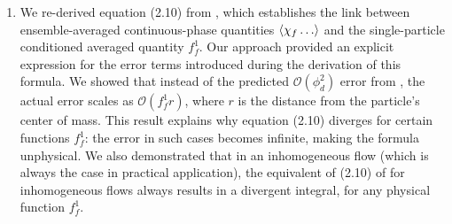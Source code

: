 \begin{enumerate}
    \item We re-derived equation (2.10) from \citet{batchelor1972sedimentation}, which establishes the link between ensemble-averaged continuous-phase quantities $\left<\chi_f\ldots\right>$ and the single-particle conditioned averaged quantity $f_f^1$. 
    Our approach provided an explicit expression for the error terms introduced during the derivation of this formula.
    We showed that instead of the predicted $\mathcal{O}(\phi_d^2)$ error from \citet{batchelor1972sedimentation}, the actual error scales as $\mathcal{O}(f_f^1 r)$, where $r$ is the distance from the particle's center of mass. 
    This result explains why equation (2.10) diverges for certain functions $f_f^1$: the error in such cases becomes infinite, making the formula unphysical.
    We also demonstrated that in an inhomogeneous flow (which is always the case in practical application), the equivalent of (2.10) of \citet{batchelor1972sedimentation} for inhomogeneous flows always results in a divergent integral, for any physical function $f_f^1$.
\end{enumerate}